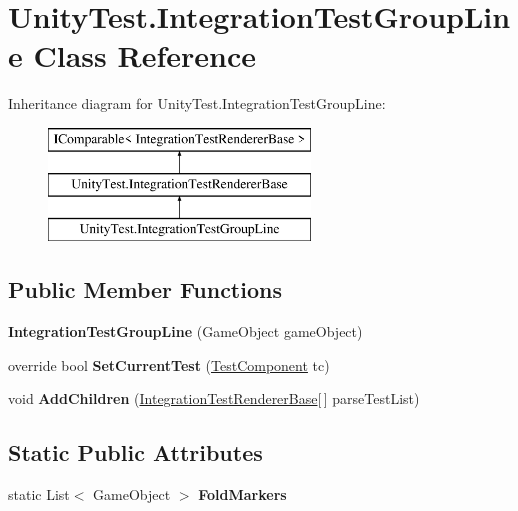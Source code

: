 \hypertarget{class_unity_test_1_1_integration_test_group_line}{}\section{Unity\+Test.\+Integration\+Test\+Group\+Line Class Reference}
\label{class_unity_test_1_1_integration_test_group_line}
Inheritance diagram for Unity\+Test.\+Integration\+Test\+Group\+Line\+:\begin{figure}[H]
\begin{center}
\leavevmode
\includegraphics[height=3.000000cm]{class_unity_test_1_1_integration_test_group_line}
\end{center}
\end{figure}
\subsection*{Public Member Functions}
\begin{DoxyCompactItemize}
\item 
\mbox{\label{class_unity_test_1_1_integration_test_group_line_a7827b861dde68c7209e5c09e57e49087}} 
{\bfseries Integration\+Test\+Group\+Line} (Game\+Object game\+Object)
\item 
\mbox{\label{class_unity_test_1_1_integration_test_group_line_a2dba08b5cacfc2ec6b2d44273f016455}} 
override bool {\bfseries Set\+Current\+Test} (\hyperlink{class_unity_test_1_1_test_component}{Test\+Component} tc)
\item 
\mbox{\label{class_unity_test_1_1_integration_test_group_line_aaa12bdb7a128fa487f2935aa8dc8ff86}} 
void {\bfseries Add\+Children} (\hyperlink{class_unity_test_1_1_integration_test_renderer_base}{Integration\+Test\+Renderer\+Base}\mbox{[}$\,$\mbox{]} parse\+Test\+List)
\end{DoxyCompactItemize}
\subsection*{Static Public Attributes}
\begin{DoxyCompactItemize}
\item 
\mbox{\label{class_unity_test_1_1_integration_test_group_line_ad7e8370a8812c3cb9894a703cfff31ce}} 
static List$<$ Game\+Object $>$ {\bfseries Fold\+Markers}
\end{DoxyCompactItemize}
